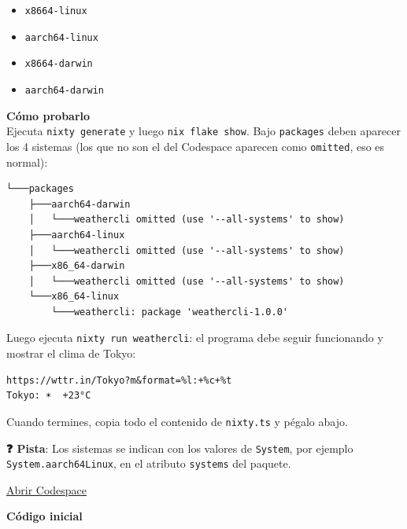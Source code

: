 \begin{itemize}
\item \texttt{x86\textunderscore{}64-linux}
\item \texttt{aarch64-linux}
\item \texttt{x86\textunderscore{}64-darwin}
\item \texttt{aarch64-darwin}
\end{itemize}

\textbf{Cómo probarlo}\\
Ejecuta \texttt{nixty generate} y luego \texttt{nix flake show}. Bajo \texttt{packages} deben aparecer los 4 sistemas (los que no son el del Codespace aparecen como \texttt{omitted}, eso es normal):

\begin{bloquecodigo}
\begin{lstlisting}
└───packages
    ├───aarch64-darwin
    │   └───weathercli omitted (use '--all-systems' to show)
    ├───aarch64-linux
    │   └───weathercli omitted (use '--all-systems' to show)
    ├───x86_64-darwin
    │   └───weathercli omitted (use '--all-systems' to show)
    └───x86_64-linux
        └───weathercli: package 'weathercli-1.0.0'
\end{lstlisting}
\end{bloquecodigo}

Luego ejecuta \texttt{nixty run weathercli}: el programa debe seguir funcionando y mostrar el clima de Tokyo:

\begin{bloquecodigo}
\begin{lstlisting}
https://wttr.in/Tokyo?m&format=%l:+%c+%t
Tokyo: ☀️  +23°C
\end{lstlisting}
\end{bloquecodigo}

Cuando termines, copia todo el contenido de \texttt{nixty.ts} y pégalo abajo.

\textbf{❓ Pista}: Los sistemas se indican con los valores de \texttt{System}, por ejemplo \texttt{System.\allowbreak{}aarch64Linux}, en el atributo \texttt{systems} del paquete.

\href{https://codespaces.new/DanielRasho/Thesis-codespaces?quickstart=1&devcontainer_path=.devcontainer/nixty/devcontainer.json}{\underline{Abrir Codespace}}

\textbf{Código inicial}

